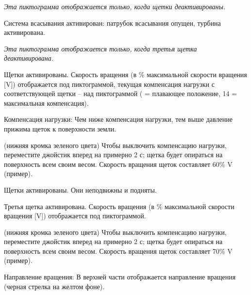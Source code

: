 {\em Эта пиктограмма отображается только, когда щетки деактивированы.}

\startSymVpad
{}
\SymVpad
{} Система всасывания активирован:
патрубок всасывания опущен, турбина активирована.
\stopSymVpad



{\em Эта пиктограмма отображается только, когда третья щетка деактивирована.}

\startSymVpad
{}
\SymVpad
{} Щетки активированы. Скорость вращения (в \% максимальной скорости вращения [V]) отображается под пиктограммой, текущая компенсация нагрузки с соответствующей щетки – над пиктограммой (\type{ } = плавающее положение, 14 = максимальная компенсация).

{\md Компенсация нагрузки:} {\lt Чем ниже компенсация нагрузки, тем выше давление прижима щеток к поверхности земли.}
\stopSymVpad


\startSymVpad
{}
\SymVpad
{}(нижняя кромка зеленого цвета)
Чтобы выключить компенсацию нагрузки, переместите джойстик вперед на примерно 2 с; щетка будет опираться на поверхность всем своим весом. Скорость вращения щеток составляет 60\hairspace\% V (пример).
\stopSymVpad

\startSymVpad
{}
\SymVpad
{} Щетки активированы. Они неподвижны и подняты.
\stopSymVpad



\startSymVpad
{}
\SymVpad
{} Третья щетка активирована. Скорость вращения (в \% максимальной скорости вращения [V]) отображается под пиктограммой.
\stopSymVpad


\startSymVpad
{}
\SymVpad
{}(нижняя кромка зеленого цвета)
Чтобы выключить компенсацию нагрузки, переместите джойстик вперед на примерно 2 с; щетка будет опираться на поверхность всем своим весом. Скорость вращения щеток составляет 70\hairspace\% V (пример).

{\md Направление вращения:} {\lt В верхней части отображается направление вращения (черная стрелка на желтом фоне).}
\stopSymVpad

